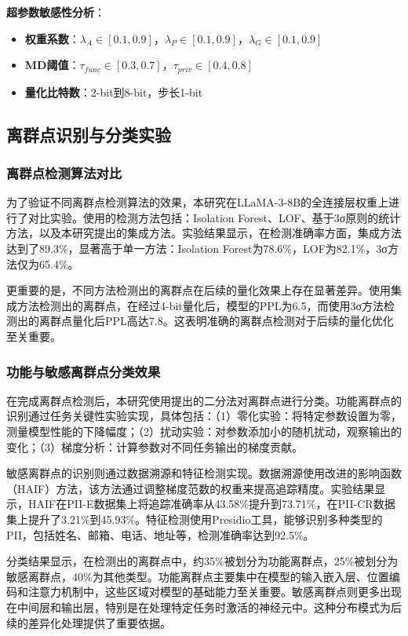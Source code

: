 \textbf{超参数敏感性分析}：
\begin{itemize}
\item \textbf{权重系数}：$\lambda_A \in [0.1, 0.9]$，$\lambda_P \in [0.1, 0.9]$，$\lambda_G \in [0.1, 0.9]$
\item \textbf{MD阈值}：$\tau_{func} \in [0.3, 0.7]$，$\tau_{priv} \in [0.4, 0.8]$
\item \textbf{量化比特数}：2-bit到8-bit，步长1-bit
\end{itemize}

\subsection{离群点识别与分类实验}

\subsubsection{离群点检测算法对比}

为了验证不同离群点检测算法的效果，本研究在LLaMA-3-8B的全连接层权重上进行了对比实验。使用的检测方法包括：Isolation Forest、LOF、基于3σ原则的统计方法，以及本研究提出的集成方法。实验结果显示，在检测准确率方面，集成方法达到了89.3\%，显著高于单一方法：Isolation Forest为78.6\%，LOF为82.1\%，3σ方法仅为65.4\%。

更重要的是，不同方法检测出的离群点在后续的量化效果上存在显著差异。使用集成方法检测出的离群点，在经过4-bit量化后，模型的PPL为6.5，而使用3σ方法检测出的离群点量化后PPL高达7.8。这表明准确的离群点检测对于后续的量化优化至关重要。

\subsubsection{功能与敏感离群点分类效果}

在完成离群点检测后，本研究使用提出的二分法对离群点进行分类。功能离群点的识别通过任务关键性实验实现，具体包括：（1）零化实验：将特定参数设置为零，测量模型性能的下降幅度；（2）扰动实验：对参数添加小的随机扰动，观察输出的变化；（3）梯度分析：计算参数对不同任务输出的梯度贡献。

敏感离群点的识别则通过数据溯源和特征检测实现。数据溯源使用改进的影响函数（HAIF）方法，该方法通过调整梯度范数的权重来提高追踪精度。实验结果显示，HAIF在PII-E数据集上将追踪准确率从43.58\%提升到73.71\%，在PII-CR数据集上提升了3.21\%到45.93\%。特征检测使用Presidio工具，能够识别多种类型的PII，包括姓名、邮箱、电话、地址等，检测准确率达到92.5\%。

分类结果显示，在检测出的离群点中，约35\%被划分为功能离群点，25\%被划分为敏感离群点，40\%为其他类型。功能离群点主要集中在模型的输入嵌入层、位置编码和注意力机制中，这些区域对模型的基础能力至关重要。敏感离群点则更多出现在中间层和输出层，特别是在处理特定任务时激活的神经元中。这种分布模式为后续的差异化处理提供了重要依据。

